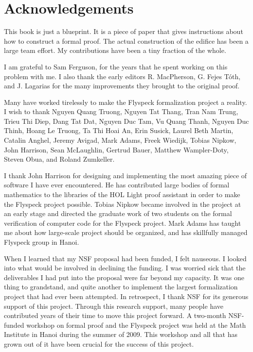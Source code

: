 

\section*{Acknowledgements}

This book is just a blueprint.  It is a piece of paper that gives instructions
about how to construct a formal proof.  The actual construction of the edifice
has been a large team effort.  My contributions have been a tiny fraction of the whole.

I am grateful to Sam Ferguson, for the years that
he spent working on this problem with me.  I also thank the early editors
R. MacPherson, G. Fejes T\'oth, and J. Lagarias for the many improvements
they brought to the original proof.

Many  have worked tirelessly
 to make the Flyspeck formalization project a reality.  I wish to thank
Nguyen Quang Truong, %
Nguyen Tat Thang, %
Tran Nam Trung,
Trieu Thi Diep, Dang Tat Dat, Nguyen Duc Tam, Vu Quang Thanh, Nguyen
Duc Thinh, Hoang Le Truong, Ta Thi Hoai An, Erin Susick, Laurel Beth Martin, Catalin
Anghel, Jeremy Avigad, Mark Adams, Freek Wiedijk, Tobias Nipkow, John
Harrison, Sean McLaughlin, Gertrud Bauer, Matthew Wampler-Doty, Steven
Obua, and Roland Zumkeller. 

 I thank John Harrison for designing and implementing the most amazing piece of
 software I have ever encountered.  He has contributed large bodies of formal mathematics to
the libraries of the HOL Light proof assistant in order to make the Flyspeck project
possible.   Tobias Nipkow became involved in the project at an early stage and
directed the graduate work of two students on the formal verification of computer
code for the Flyspeck project. Mark Adams has taught me about how
 large-scale project should be organized, and has skillfully managed 
  Flyspeck group in Hanoi.

  When I learned that my NSF proposal had been funded, I felt
  nauseous.  I looked into what would be involved in declining the
  funding.  I was  worried sick that the  deliverables I had put
  into the proposal were far beyond my capacity.  It was one thing to
  grandstand, and quite another to implement the largest
  formalization project that had ever been attempted.  In retrospect, I
  thank NSF for its generous support of this project.  Through this
  research support, many people have contributed years of their time to move this
  project forward.  A two-month NSF-funded workshop on formal proof
  and the Flyspeck project was held at the Math Institute in Hanoi during the summer of
  2009.  This workshop and all that has grown out of it have been crucial for
  the success of this project.

